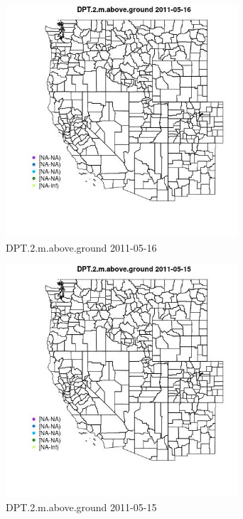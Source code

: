 \begin{figure} 
\centering  
\includegraphics[width=0.77\textwidth]{Code_Outputs/ML_input_report_ML_input_PM25_Step5_part_d_de_duplicated_aves_ML_input_MapObsDPT2maboveground2011-05-16.jpg} 
\caption{\label{fig:ML_input_report_ML_input_PM25_Step5_part_d_de_duplicated_aves_ML_inputMapObsDPT2maboveground2011-05-16}DPT.2.m.above.ground 2011-05-16} 
\end{figure} 
 

\begin{figure} 
\centering  
\includegraphics[width=0.77\textwidth]{Code_Outputs/ML_input_report_ML_input_PM25_Step5_part_d_de_duplicated_aves_ML_input_MapObsDPT2maboveground2011-05-15.jpg} 
\caption{\label{fig:ML_input_report_ML_input_PM25_Step5_part_d_de_duplicated_aves_ML_inputMapObsDPT2maboveground2011-05-15}DPT.2.m.above.ground 2011-05-15} 
\end{figure} 
 

